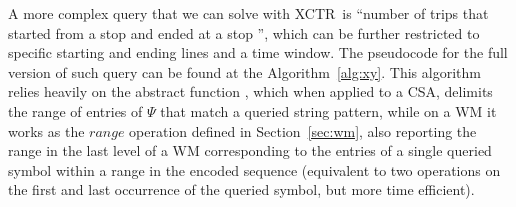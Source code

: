 \documentclass[runningheads]{llncs}
\newcommand{\ctr}{XCTR}
\begin{document}
\begin{algorithm}[hbt!]
 
 
 \caption{Extracting the trip  from \ctr, where ,  and  are the structures previously described in (i), (ii) and (iii), respectively}
 \label{alg:extract}
\end{algorithm}

A more complex query that we can solve with \ctr~is ``number of trips that started from a stop  and ended at a stop '', which can be further restricted to specific starting and ending lines and a time window. The pseudocode for the full version of such query can be found at the Algorithm~\ref{alg:xy}. This algorithm relies heavily on the abstract function , which when applied to a CSA, delimits the range of entries of $\Psi$ that match a queried string pattern, while on a WM it works as the $range$ operation defined in Section~\ref{sec:wm}, also reporting the range in the last level of a WM corresponding to the entries of a single queried symbol within a range in the encoded sequence (equivalent to two  operations on the first and last occurrence of the queried symbol, but more time efficient).
\end{document}

